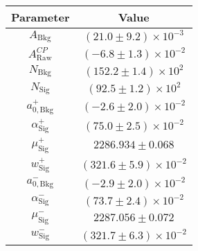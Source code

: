 \begin{tabular}{cc}
  \toprule
  Parameter & Value \\
  \midrule
$A_{\mathrm{Bkg}}$ & $(21.0 \pm 9.2) \times 10^{-3}$ \\
$A_{\mathrm{Raw}}^{C\!P}$ & $(-6.8 \pm 1.3) \times 10^{-2}$ \\
$N_{\mathrm{Bkg}}$ & $(152.2 \pm 1.4) \times 10^{2}$ \\
$N_{\mathrm{Sig}}$ & $(92.5 \pm 1.2) \times 10^{2}$ \\
$a_{0,\mathrm{Bkg}}^{+}$ & $(-2.6 \pm 2.0) \times 10^{-2}$ \\
$\alpha_{\mathrm{Sig}}^{+}$ & $(75.0 \pm 2.5) \times 10^{-2}$ \\
$\mu_{\mathrm{Sig}}^{+}$ & $2286.934 \pm 0.068$ \\
$w_{\mathrm{Sig}}^{+}$ & $(321.6 \pm 5.9) \times 10^{-2}$ \\
$a_{0,\mathrm{Bkg}}^{-}$ & $(-2.9 \pm 2.0) \times 10^{-2}$ \\
$\alpha_{\mathrm{Sig}}^{-}$ & $(73.7 \pm 2.4) \times 10^{-2}$ \\
$\mu_{\mathrm{Sig}}^{-}$ & $2287.056 \pm 0.072$ \\
$w_{\mathrm{Sig}}^{-}$ & $(321.7 \pm 6.3) \times 10^{-2}$ \\
  \bottomrule
\end{tabular}